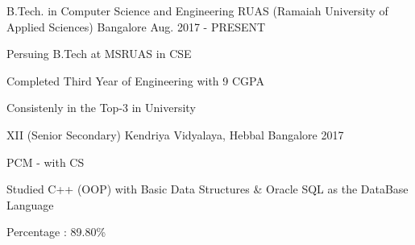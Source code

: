 \begin{cventries}
  \cventry
    {B.Tech. in Computer Science and Engineering}
    {RUAS (Ramaiah University of Applied Sciences)}
    {Bangalore}
    {Aug. 2017 - PRESENT}
    {
      \begin{cvitems}
        \item {Persuing B.Tech at MSRUAS in CSE}
        \item {Completed Third Year of Engineering with 9 CGPA}
        \item {Consistenly in the Top-3 in University}
      \end{cvitems}
    }
  \cventry
    {XII (Senior Secondary)}
    {Kendriya Vidyalaya, Hebbal}
    {Bangalore}
    {2017}
    {
      \begin{cvitems}
        \item {PCM - with CS}
        \item {Studied C++ (OOP) with Basic Data Structures \& Oracle SQL as the DataBase Language}
        \item {Percentage : 89.80\%}
      \end{cvitems}
    }
\end{cventries}
